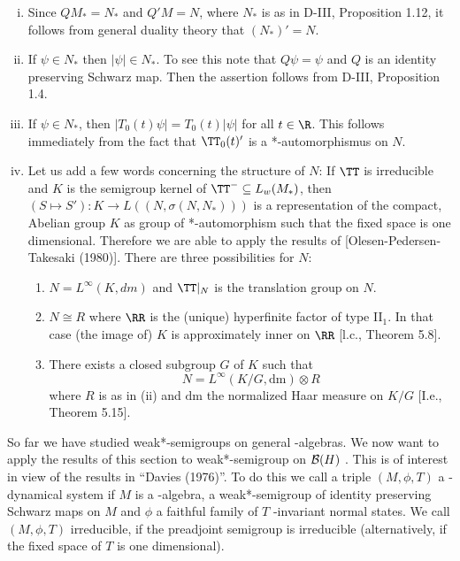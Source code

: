 \begin{remarks}\label{rem:d4-3.6}
\begin{enumerate}[(i)]
\item
Since $QM_{*} = N_{*}$ and $Q'M = N$, where $N_{*}$ is as in D-III, Proposition 1.12, it follows from general duality theory that $(N_{*})' = N$.

\item
If $\psi \in N_{*}$ then $|\psi| \in N_{*}$.
To see this note that $Q\psi = \psi$ and $Q$ is an identity preserving Schwarz map.
Then the assertion follows from D-III, Proposition 1.4.

\item
If $\psi \in N_{*}$, then $|T_{0}(t)\psi| = T_{0}(t)|\psi|$ for all $t \in \R$.
This follows immediately from the fact that $\TT_{0}(t)'$ is a *-automorphismus on $N$.

\item
Let us add a few words concerning the structure of $N$: If $\TT$ is irreducible and $K$ is the semigroup kernel of $\TT^{-} \subseteq L_{w}(M_{*})$, then $(S \mapsto S'): K \to L((N,\sigma(N,N_{*})))$ is a representation of the compact, Abelian group $K$ as group of *-automorphism such that the fixed space is one dimensional.
Therefore we are able to apply the results of [Olesen-Pedersen-Takesaki (1980)].
There are three possibilities for $N$:

\begin{enumerate}[--]
\item
$N = L^{\infty}(K,dm)$ and $\TT|_{N}$ is the translation group on $N$.

\item
$N \cong R$ where $\RR$ is the (unique) hyperfinite factor of type II$_{1}$.
In that case (the image of) $K$ is approximately inner on $\RR$ [l.c., Theorem 5.8].


\item
There exists a closed subgroup $ G $  of $ K $  such that
\[
N = L^{\infty}(K/G, \text{dm}) \otimes R
\]
where $ R $  is as in (ii) and $ \text{dm} $  the normalized Haar measure on $ K/G $  [I.e., Theorem 5.15].
\end{enumerate}
\end{enumerate}
\end{remarks}
\newpage
So far we have studied weak*-semigroups on general \WA-algebras.
We now want to apply the results of this section to weak*-semigroup on $ \mathcal{B}(H) $ .
This is of interest in view of the results in \enquote{Davies (1976)}.
To do this we call a triple $ (M,\phi,T) $  a \WA-dynamical system if $ M $  is a \WA-algebra, a weak*-semigroup of identity preserving Schwarz maps on $ M $  and $ \phi $  a faithful family of $ T $ -invariant normal states.
We call $ (M,\phi,T) $  irreducible, if the preadjoint semigroup is irreducible (alternatively, if the fixed space of $ T $  is one dimensional).

